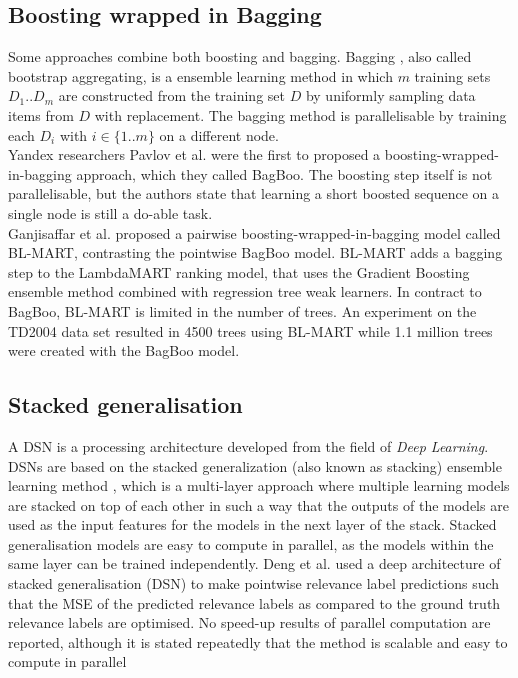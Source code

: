 \subsection{Boosting wrapped in Bagging}
Some approaches combine both boosting and bagging. Bagging \cite{Breiman1996}, also called bootstrap aggregating, is a ensemble learning method in which $m$ training sets $D_1..D_m$ are constructed from the training set $D$ by uniformly sampling data items from $D$ with replacement. The bagging method is parallelisable by training each $D_i$ with $i \in \{1..m\}$ on a different node.\\

Yandex researchers Pavlov et al. \cite{Pavlov2010} were the first to proposed a boosting-wrapped-in-bagging approach, which they called BagBoo. The boosting step itself is not parallelisable, but the authors state that learning a short boosted sequence on a single node is still a do-able task.\\

Ganjisaffar et al. \cite{Ganjisaffar2011c, Ganjisaffar2011b} proposed a pairwise boosting-wrapped-in-bagging model called BL-MART, contrasting the pointwise BagBoo model. BL-MART adds a bagging step to the LambdaMART \cite{Wu2008} ranking model, that uses the Gradient Boosting \cite{Friedman2002} ensemble method combined with regression tree weak learners. In contract to BagBoo, BL-MART is limited in the number of trees. An experiment on the TD2004 data set resulted in 4500 trees using BL-MART while 1.1 million trees were created with the BagBoo model.

\subsection{Stacked generalisation}
A \ac{DSN} is a processing architecture developed from the field of \emph{Deep Learning}. \ac{DSN}s are based on the stacked generalization (also known as stacking) ensemble learning method \cite{Wolpert1992}, which is a multi-layer approach where multiple learning models are stacked on top of each other in such a way that the outputs of the models are used as the input features for the models in the next layer of the stack. Stacked generalisation models are easy to compute in parallel, as the models within the same layer can be trained independently. Deng et al. \cite{Deng2013} used a deep architecture of stacked generalisation (\ac{DSN}) to make pointwise relevance label predictions such that the \ac{MSE} of the predicted relevance labels as compared to the ground truth relevance labels are optimised. No speed-up results of parallel computation are reported, although it is stated repeatedly that the method is scalable and easy to compute in parallel

